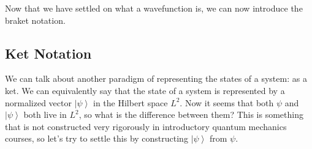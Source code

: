 \documentclass{article}
\newcommand{\ket}[1]{\ensuremath{\left|#1\right\rangle}}
\begin{document}
    Now that we have settled on what a wavefunction is, we can now introduce the braket notation. 

    \subsection{Ket Notation} 

      We can talk about another paradigm of representing the states of a system: as a ket. We can equivalently say that the state of a system is represented by a normalized vector $\ket{\psi}$ in the Hilbert space $L^2$. Now it seems that both $\psi$ and $\ket{\psi}$ both live in $L^2$, so what is the difference between them? This is something that is not constructed very rigorously in introductory quantum mechanics courses, so let's try to settle this by constructing $\ket{\psi}$ from $\psi$. 
\end{document}
